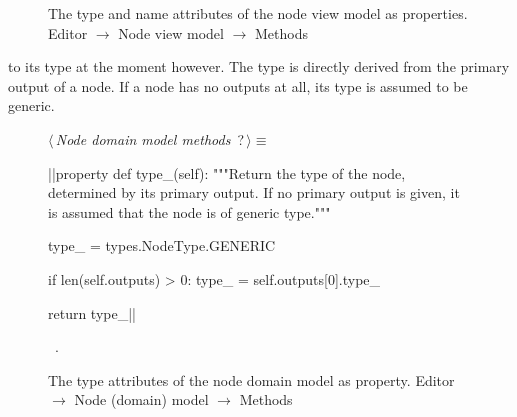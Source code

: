 \documentclass[%
    a4paper,    %
    justified,  %
    nobib,      %
    openany     %
]{tufte-book}
\makeatletter
\renewcommand{\label}[1]{\@tufte@label{##1}}%
\makeatother
\begin{document}
\begin{figure}
\begin{flushleft}
\begin{minipage}{\linewidth}
\begin{list}{}{\setlength{\itemsep}{-\parsep}\setlength{\itemindent}{-\leftmargin}}
\item{}
\end{list}
\end{minipage}\vspace{4ex}
\end{flushleft}
\caption{The type and name attributes of the node view model as properties.
  \newline{}\newline{}Editor $\rightarrow$ Node view model $\rightarrow$
  Methods}
\label{editor:lst:node-view-model:methods:name}
\end{figure}

 to its type at the moment
however. The type is directly derived from the primary output of a node. If a
node has no outputs at all, its type is assumed to be generic.

\begin{figure}
\begin{flushleft} \small
\begin{minipage}{\linewidth}\label{scrap72}\raggedright\small
{} $\langle\,${\itshape Node domain model methods}\nobreak\ {\footnotesize {?}}$\,\rangle\equiv$
\vspace{-1ex}
\begin{pythoncode}
|\normalfont{}\fontfamily{}|property
def type_(self):
    """Return the type of the node, determined by its primary output.
    If no primary output is given, it is assumed that the node is of
    generic type."""

    type_ = types.NodeType.GENERIC

    if len(self.outputs) > 0:
        type_ = self.outputs[0].type_

    return type_|\NWsep|
\end{pythoncode}
\vspace{1.5ex}
\footnotesize
\begin{list}{}{\setlength{\itemsep}{-\parsep}\setlength{\itemindent}{-\leftmargin}}
\item \NWtxtMacroRefIn\ .

\item{}
\end{list}
\end{minipage}\vspace{4ex}
\end{flushleft}
\caption{The type attributes of the node domain model as property.
  \newline{}\newline{}Editor $\rightarrow$ Node (domain) model $\rightarrow$
  Methods}
\label{editor:lst:node-domain-model:methods:type}
\end{figure}
\end{document}
